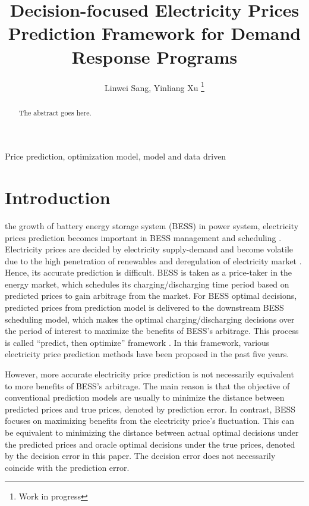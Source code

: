 \documentclass[journal]{IEEEtran}
\begin{document}
\title{Decision-focused Electricity Prices Prediction Framework for Demand Response Programs}

\author{Linwei Sang,
Yinliang Xu
\thanks{Work in progress}
}

\maketitle

\begin{abstract}
The abstract goes here.
\end{abstract}

\begin{IEEEkeywords}
Price prediction, optimization model, model and data driven
\end{IEEEkeywords}


\IEEEpeerreviewmaketitle


\section{Introduction}

 the growth of battery energy storage system (BESS) in power system, electricity prices prediction becomes important in BESS management and scheduling \cite{Chitsaz2018}. Electricity prices are decided by electricity supply-demand and become volatile due to the high penetration of renewables and deregulation of electricity market \cite{Peng2018}. Hence, its accurate prediction is difficult. BESS is taken as a price-taker in the energy market, which schedules its charging/discharging time period based on predicted prices to gain arbitrage from the market\cite{Arteaga2019}. For BESS optimal decisions, predicted prices from prediction model is delivered to the downstream BESS scheduling model, which makes the optimal charging/discharging decisions over the period of interest to maximize the benefits of BESS's arbitrage. This process is called ``predict, then optimize'' framework \cite{Elmachtoub2020}. In this framework, various electricity price prediction methods have been proposed in the past five years. 

However, more accurate electricity price prediction is not necessarily equivalent to more benefits of BESS's arbitrage. The main reason is that the objective of conventional prediction models are usually to minimize the distance between predicted prices and true prices, denoted by prediction error. In contrast, BESS focuses on maximizing benefits from the electricity price's fluctuation. This can be equivalent to minimizing the distance between actual optimal decisions under the predicted prices and oracle optimal decisions under the true prices, denoted by the decision error in this paper. The decision error does not necessarily coincide with the prediction error. 
\end{document}
